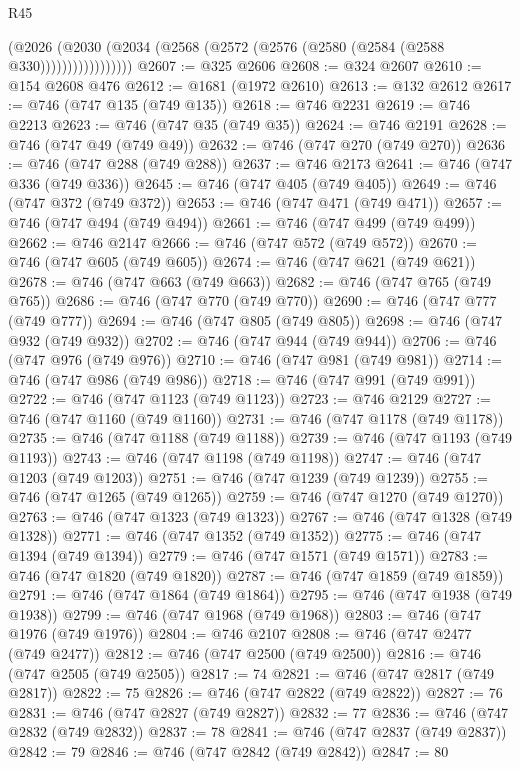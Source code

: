 \begin{lexlean}{R45}
\begin{coremodule}
                    (@2026
                      (@2030 (@2034 (@2568 (@2572 (@2576 (@2580 (@2584 (@2588 @330)))))))))))))))))
@2607 := @325 @2606
@2608 := @324 @2607
@2610 := @154 @2608 @476
@2612 := @1681 (@1972 @2610)
@2613 := @132 @2612
@2617 := @746 (@747 @135 (@749 @135))
@2618 := @746 @2231
@2619 := @746 @2213
@2623 := @746 (@747 @35 (@749 @35))
@2624 := @746 @2191
@2628 := @746 (@747 @49 (@749 @49))
@2632 := @746 (@747 @270 (@749 @270))
@2636 := @746 (@747 @288 (@749 @288))
@2637 := @746 @2173
@2641 := @746 (@747 @336 (@749 @336))
@2645 := @746 (@747 @405 (@749 @405))
@2649 := @746 (@747 @372 (@749 @372))
@2653 := @746 (@747 @471 (@749 @471))
@2657 := @746 (@747 @494 (@749 @494))
@2661 := @746 (@747 @499 (@749 @499))
@2662 := @746 @2147
@2666 := @746 (@747 @572 (@749 @572))
@2670 := @746 (@747 @605 (@749 @605))
@2674 := @746 (@747 @621 (@749 @621))
@2678 := @746 (@747 @663 (@749 @663))
@2682 := @746 (@747 @765 (@749 @765))
@2686 := @746 (@747 @770 (@749 @770))
@2690 := @746 (@747 @777 (@749 @777))
@2694 := @746 (@747 @805 (@749 @805))
@2698 := @746 (@747 @932 (@749 @932))
@2702 := @746 (@747 @944 (@749 @944))
@2706 := @746 (@747 @976 (@749 @976))
@2710 := @746 (@747 @981 (@749 @981))
@2714 := @746 (@747 @986 (@749 @986))
@2718 := @746 (@747 @991 (@749 @991))
@2722 := @746 (@747 @1123 (@749 @1123))
@2723 := @746 @2129
@2727 := @746 (@747 @1160 (@749 @1160))
@2731 := @746 (@747 @1178 (@749 @1178))
@2735 := @746 (@747 @1188 (@749 @1188))
@2739 := @746 (@747 @1193 (@749 @1193))
@2743 := @746 (@747 @1198 (@749 @1198))
@2747 := @746 (@747 @1203 (@749 @1203))
@2751 := @746 (@747 @1239 (@749 @1239))
@2755 := @746 (@747 @1265 (@749 @1265))
@2759 := @746 (@747 @1270 (@749 @1270))
@2763 := @746 (@747 @1323 (@749 @1323))
@2767 := @746 (@747 @1328 (@749 @1328))
@2771 := @746 (@747 @1352 (@749 @1352))
@2775 := @746 (@747 @1394 (@749 @1394))
@2779 := @746 (@747 @1571 (@749 @1571))
@2783 := @746 (@747 @1820 (@749 @1820))
@2787 := @746 (@747 @1859 (@749 @1859))
@2791 := @746 (@747 @1864 (@749 @1864))
@2795 := @746 (@747 @1938 (@749 @1938))
@2799 := @746 (@747 @1968 (@749 @1968))
@2803 := @746 (@747 @1976 (@749 @1976))
@2804 := @746 @2107
@2808 := @746 (@747 @2477 (@749 @2477))
@2812 := @746 (@747 @2500 (@749 @2500))
@2816 := @746 (@747 @2505 (@749 @2505))
@2817 := 74
@2821 := @746 (@747 @2817 (@749 @2817))
@2822 := 75
@2826 := @746 (@747 @2822 (@749 @2822))
@2827 := 76
@2831 := @746 (@747 @2827 (@749 @2827))
@2832 := 77
@2836 := @746 (@747 @2832 (@749 @2832))
@2837 := 78
@2841 := @746 (@747 @2837 (@749 @2837))
@2842 := 79
@2846 := @746 (@747 @2842 (@749 @2842))
@2847 := 80

\end{coremodule}
\end{lexlean}
